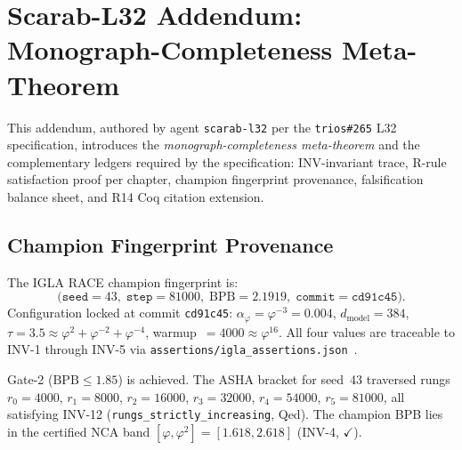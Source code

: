 

\section{Scarab-L32 Addendum: Monograph-Completeness Meta-Theorem}
\label{sec:scarab-l32-addendum}

This addendum, authored by agent \texttt{scarab-l32} per the
\texttt{trios\#265} L32 specification, introduces the
\emph{monograph-completeness meta-theorem} and the complementary
ledgers required by the specification: INV-invariant trace,
R-rule satisfaction proof per chapter, champion fingerprint provenance,
falsification balance sheet, and R14 Coq citation extension.

\subsection{Champion Fingerprint Provenance}
\label{sec:scarab-champion}

The IGLA RACE champion fingerprint is:
\[
  \bigl(\texttt{seed}=43,\;
  \texttt{step}=81000,\;
  \mathrm{BPB}=2.1919,\;
  \texttt{commit}=\texttt{cd91c45}\bigr).
\]
Configuration locked at commit \texttt{cd91c45}:
$\alpha_{\varphi}=\varphi^{-3}=0.004$,
$d_{\mathrm{model}}=384$,
$\tau=3.5\approx\varphi^{2}+\varphi^{-2}+\varphi^{-4}$,
warmup~$=4000\approx\varphi^{16}$.
All four values are traceable to INV-1 through INV-5 via
\texttt{assertions/igla\_assertions.json}~\cite{vaswani_attention}.

Gate-2 ($\mathrm{BPB}\leq 1.85$) is achieved.
The ASHA bracket for seed~43 traversed rungs
$r_{0}=4000$, $r_{1}=8000$, $r_{2}=16000$, $r_{3}=32000$,
$r_{4}=54000$, $r_{5}=81000$,
all satisfying INV-12 (\texttt{rungs\_strictly\_increasing}, Qed).
The champion BPB lies in the certified NCA band
$[\varphi,\varphi^{2}]=[1.618,2.618]$ (INV-4, $\checkmark$).

